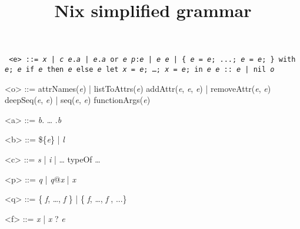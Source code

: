 \documentclass{article}
\title{Nix simplified grammar}
\date{}
\newcommand{\meta}[1]{\emph{\textsl{#1}}} %
\renewcommand{\|}{\textrm{|}}
\def\e/{\meta{e}}
\def\a/{\meta{a}}
\def\b/{\meta{b}}
\def\c/{\meta{c}}
\def\p/{\meta{p}}
\def\q/{\meta{q}}
\def\f/{\meta{f}}
\def\x/{\meta{x}}
\def\o/{\meta{o}}
\begin{document}
\maketitle{}

\begin{grammar}
  \tt
<e> ::=
    \x/ \| \c/
  \alt \e/.\a/ \| \e/.\a/ or \e/
  \alt \p/:\e/ \| \e/ \e/
  \alt [ \e/ \ldots{} \e/ ] \| \{ \e/ = \e/; ...; \e/ = \e/; \}
  \alt with \e/; \e/
  \alt if \e/ then \e/ else \e/
  \alt let \x/ = \e/; \ldots{;} \x/ = \e/; in \e/
  \alt \e/ :: \e/ \| nil
  \alt \o/

  <o> ::= attrNames(\e/) \| listToAttrs(\e/)
  \alt addAttr(\e/, \e/, \e/) \| removeAttr(\e/, \e/)
  \alt deepSeq(\e/, \e/) \| seq(\e/, \e/)
  \alt functionArgs(\e/)

<a> ::= \b/. \ldots{} .\b/

<b> ::= \$\{\e/\} \| \meta{l}

<c> ::= \meta{s} \| \meta{i} \| \ldots{}
  \alt typeOf
  \alt \ldots{}

<p> ::= \q/ \| \q/@\x/ \| \x/

<q> ::= \{ \f/, \ldots{,} \f/ \} \| \{ \f/, \ldots{,} \f/ , ...\}

<f> ::= \x/ \| \x/ ? \e/

\end{grammar}
\end{document}
